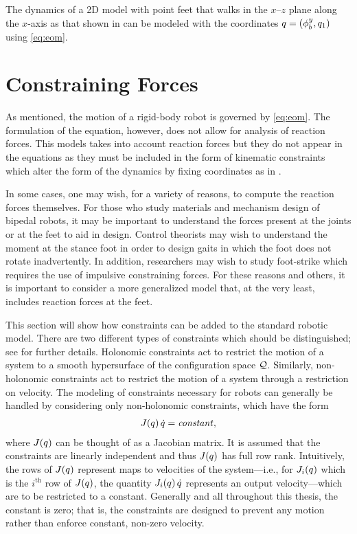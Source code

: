 \begin{exmp}
  \label{ex:compass_gait_reduced_coordinates}
  The dynamics of a 2D model with point feet that walks in the
  $x$--$z$ plane along the $x$-axis as that shown in
   can be modeled with the
  coordinates $q = (\phi_{b}^{y}, q_{1})$ using \eqref{eq:eom}.
\end{exmp}


\section{Constraining Forces}

As mentioned, the motion of a rigid-body robot is governed by \eqref{eq:eom}.
%
The formulation of the equation, however, does not allow for analysis of
reaction forces.
%
This models takes into account reaction forces but they do not appear in the
equations as they must be included in the form of kinematic constraints which
alter the form of the dynamics by fixing coordinates as in .

In some cases, one may wish, for a variety of reasons, to compute the reaction
forces themselves.
%
For those who study materials and mechanism design of bipedal robots, it may be
important to understand the forces present at the joints or at the feet to aid
in design.
%
Control theorists may wish to understand the moment at the stance foot in order
to design gaits in which the foot does not rotate inadvertently.
%
In addition, researchers may wish to study foot-strike which requires the use of
impulsive constraining forces.
%
For these reasons and others, it is important to consider a more generalized
model that, at the very least, includes reaction forces at the feet.

This section will show how constraints can be added to the standard robotic
model.
%
There are two different types of constraints which should be distinguished; see
\cite[Ch. 6]{Murray1994} for further details.
%
Holonomic constraints act to restrict the motion of a system to a smooth
hypersurface of the configuration space $\mathcal{Q}$.
%
Similarly, non-holonomic constraints act to restrict the motion of a system
through a restriction on velocity.
%
The modeling of constraints necessary for robots can generally be handled by
considering only non-holonomic constraints, which have the form
\begin{align}
  \label{eq:holocon}
  J(q) \, \dot{q} = \mathit{constant},
\end{align}
where $J(q)$ can be thought of as a Jacobian matrix.
%
It is assumed that the constraints are linearly independent and thus $J(q)$
has full row rank.
%
Intuitively, the rows of $J(q)$ represent maps to velocities of the
system---i.e., for $J_{i}(q)$ which is the $i^{\mathrm{th}}$ row of
$J(q)$, the quantity $J_{i}(q) \, \dot{q}$ represents an output
velocity---which are to be restricted to a constant.
%
Generally and all throughout this thesis, the constant is zero; that is, the
constraints are designed to prevent any motion rather than enforce constant,
non-zero velocity.

